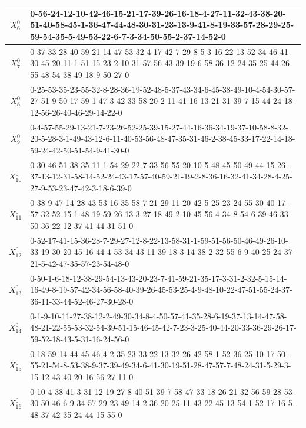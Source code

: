 \begin{landscape}
{\begin{tabularx}{\linewidth}{|c|X|}
        $X_{6}^{0}$  & 0-56-24-12-10-42-46-15-21-17-39-26-16-18-4-27-11-32-43-38-20-51-40-58-45-1-36-47-44-48-30-31-23-13-9-41-8-19-33-57-28-29-25-59-54-35-5-49-53-22-6-7-3-34-50-55-2-37-14-52-0 \\ \hline
        $X_{7}^{0}$  & 0-37-33-28-40-59-21-14-47-53-32-4-17-42-7-29-8-5-3-16-22-13-52-34-46-41-30-45-20-11-1-51-15-23-2-10-31-57-56-43-39-19-6-58-36-12-24-35-25-44-26-55-48-54-38-49-18-9-50-27-0 \\ \hline
        $X_{8}^{0}$  & 0-25-53-35-23-55-32-8-28-36-19-52-48-5-37-43-34-6-45-38-49-10-4-54-30-57-27-51-9-50-17-59-1-47-3-42-33-58-20-2-11-41-16-13-21-31-39-7-15-44-24-18-12-56-26-40-46-29-14-22-0 \\ \hline
        $X_{9}^{0}$  & 0-4-57-55-29-13-21-7-23-26-52-25-39-15-27-44-16-36-34-19-37-10-58-8-32-20-5-28-3-1-49-43-12-6-11-40-53-56-48-47-35-31-46-2-38-45-33-17-22-14-18-59-24-42-50-51-54-9-41-30-0 \\ \hline
        $X_{10}^{0}$ & 0-30-46-51-38-35-11-1-54-29-22-7-33-56-55-20-10-5-48-45-50-49-44-15-26-37-13-12-31-58-14-52-24-43-17-57-40-59-21-19-2-8-36-16-32-41-34-28-4-25-27-9-53-23-47-42-3-18-6-39-0 \\ \hline
        $X_{11}^{0}$ & 0-38-9-47-14-28-43-53-16-35-58-7-21-29-11-20-42-5-25-23-24-55-30-40-17-57-32-52-15-1-48-19-59-26-13-3-27-18-49-2-10-45-56-4-34-8-54-6-39-46-33-50-36-22-12-37-41-44-31-51-0 \\ \hline
        $X_{12}^{0}$ & 0-52-17-41-15-36-28-7-29-27-12-8-22-13-58-31-1-59-51-56-50-46-49-26-10-33-19-30-20-45-16-44-4-53-34-43-11-39-18-3-14-38-2-32-55-6-9-40-25-24-37-21-5-42-47-35-57-23-54-48-0 \\ \hline
        $X_{13}^{0}$ & 0-50-1-6-18-12-38-29-54-13-43-20-23-7-41-59-21-35-17-3-31-2-32-5-15-14-16-49-8-19-57-42-34-56-58-40-39-26-45-53-25-4-9-48-10-22-47-51-55-24-37-36-11-33-44-52-46-27-30-28-0 \\ \hline
        $X_{14}^{0}$ & 0-1-9-10-11-27-38-12-2-49-30-34-8-4-50-57-41-35-28-6-19-37-13-14-47-58-48-21-22-55-53-32-54-39-51-15-46-45-42-7-23-3-25-40-44-20-33-36-29-26-17-59-52-18-43-5-31-16-24-56-0 \\ \hline
        $X_{15}^{0}$ & 0-18-59-14-44-45-46-4-2-35-23-33-22-13-32-26-42-58-1-52-36-25-10-17-50-55-21-54-8-53-38-9-37-39-49-34-6-41-30-19-51-28-47-57-7-48-24-31-5-29-3-15-12-43-40-20-16-56-27-11-0 \\ \hline
        $X_{16}^{0}$ & 0-10-4-38-41-3-31-12-19-27-8-40-51-39-7-58-47-33-18-26-21-32-56-59-28-53-30-50-46-6-9-34-57-29-23-49-14-2-36-20-25-11-43-22-45-13-54-1-52-17-16-5-48-37-42-35-24-44-15-55-0 \\ \hline

\end{tabularx}}
\end{landscape}
